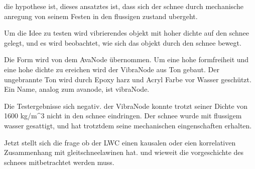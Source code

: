 die hypothese ist, dieses ansatztes ist, dass sich der schnee durch mechanische anregung von seinem Festen in den flussigen zustand ubergeht.

Um die Idee zu testen wird vibrierendes objekt mit hoher dichte auf den schnee gelegt, und es wird beobachtet, wie sich das objekt durch den schnee bewegt.


Die Form wird von dem AvaNode übernommen. Um eine hohe formfreiheit und eine hohe dichte zu ereichen wird der VibraNode aus Ton gebaut. Der ungebrannte Ton wird durch Epoxy harz und Acryl Farbe vor Wasser geschützt. Ein Name, analog zum avanode, ist vibraNode.

Die Testergebnisse sich negativ. der VibraNode konnte trotzt seiner Dichte von 1600 kg/m^3 nicht in den schnee eindringen. Der schnee wurde mit flussigem wasser gesattigt, und hat trotztdem seine mechanischen eingenschaften erhalten.

Jetzt stellt sich die frage ob der LWC einen kausalen oder eien korrelativen Zusammenhang mit gleitschneelawinen hat. und wieweit die vorgeschichte des schnees mitbetrachtet werden muss.
